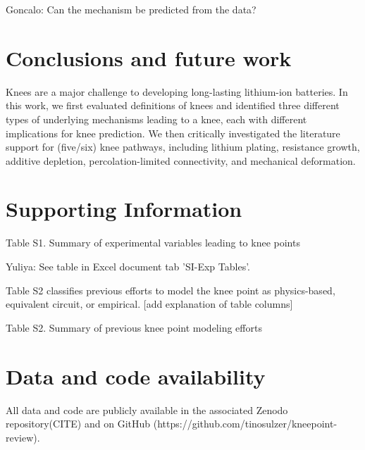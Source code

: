 \documentclass[journal=jpcl, manuscript=article, layout=onecolumn]{achemso}
\begin{document}
Goncalo: Can the mechanism be predicted from the data?

\section{Conclusions and future work}

Knees are a major challenge to developing long-lasting lithium-ion batteries. In this work, we first evaluated definitions of knees and identified three different types of underlying mechanisms leading to a knee, each with different implications for knee prediction. We then critically investigated the literature support for (five/six) knee pathways, including lithium plating, resistance growth, additive depletion, percolation-limited connectivity, and mechanical deformation.

\section{Supporting Information}

Table S1. Summary of experimental variables leading to knee points


Yuliya: See table in Excel document tab 'SI-Exp Tables'. 

Table S2 classifies previous efforts to model the knee point as physics-based, equivalent circuit, or empirical. [add explanation of table columns]

Table S2. Summary of previous knee point modeling efforts

\section{Data and code availability}

All data and code are publicly available in the associated Zenodo repository(CITE) and on GitHub (https://github.com/tinosulzer/kneepoint-review).

\newpage
\end{document}
